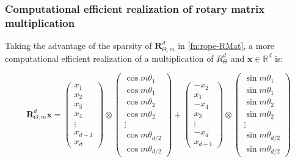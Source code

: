 \subsubsection{Computational efficient realization of rotary matrix multiplication}\label{appendix:rope-efficient}
Taking the advantage of the sparsity of ${\boldsymbol R}^d_{\Theta, m}$ in \ref{fn:rope-RMat}, a more computational efficient realization of a multiplication of $R^d_\Theta$ and ${\boldsymbol x} \in \mathbb{R}^d$ is:

\begin{equation}
	{\boldsymbol R}^d_{\Theta, m}{\boldsymbol x} = 
	\begin{pmatrix}
		x_1\\
		x_2\\
		x_3\\
		x_4\\
		\vdots\\
		x_{d-1}\\
		x_d
	\end{pmatrix}
	\otimes
	\begin{pmatrix}
		\cos{m\theta_1} \\
		\cos{m\theta_1} \\
		\cos{m\theta_2} \\
		\cos{m\theta_2} \\
		\vdots \\
		\cos{m\theta_{d/2}} \\
		\cos{m\theta_{d/2}} 
	\end{pmatrix}
	+
	\begin{pmatrix}
		-x_2\\
		x_1\\
		-x_4\\
		x_3\\
		\vdots\\
		-x_d\\
		x_{d-1}
	\end{pmatrix}
	\otimes
	\begin{pmatrix}
		\sin{m\theta_1}\\
		\sin{m\theta_1}\\
		\sin{m\theta_2}\\
		\sin{m\theta_2}\\
		\vdots\\
		\sin{m\theta_{d/2}}\\
		\sin{m\theta_{d/2}}
	\end{pmatrix}
\end{equation}

 

